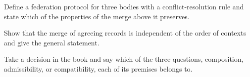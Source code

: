\begin{exercise}Define a federation protocol for three bodies with a conflict-resolution rule and state which of the properties of the merge above it preserves.\end{exercise}
\begin{exercise}Show that the merge of agreeing records is independent of the order of contexts and give the general statement.\end{exercise}
\begin{exercise}Take a decision in the book and say which of the three questions, composition, admissibility, or compatibility, each of its premises belongs to.\end{exercise}
